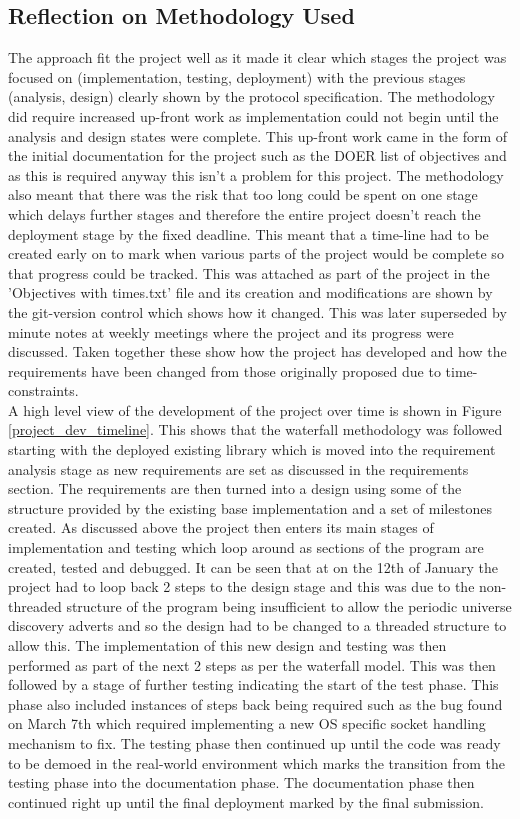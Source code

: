 \documentclass[11pt,a4paper]{report}
\begin{document}
\subsection{Reflection on Methodology Used}
The approach fit the project well as it made it clear which stages the project was focused on (implementation, testing, deployment) with the previous stages (analysis, design) clearly shown by the protocol specification. The methodology did require increased up-front work as implementation could not begin until the analysis and design states were complete. This up-front work came in the form of the initial documentation for the project such as the DOER list of objectives and as this is required anyway this isn't a problem for this project. The methodology also meant that there was the risk that too long could be spent on one stage which delays further stages and therefore the entire project doesn't reach the deployment stage by the fixed deadline. This meant that a time-line had to be created early on to mark when various parts of the project would be complete so that progress could be tracked. This was attached as part of the project in the 'Objectives with times.txt' file and its creation and modifications are shown by the git-version control which shows how it changed. This was later superseded by minute notes at weekly meetings where the project and its progress were discussed. Taken together these show how the project has developed and how the requirements have been changed from those originally proposed due to time-constraints. \\

A high level view of the development of the project over time is shown in Figure \ref{project_dev_timeline}. This shows that the waterfall methodology was followed starting with the deployed existing library which is moved into the requirement analysis stage as new requirements are set as discussed in the requirements section. The requirements are then turned into a design using some of the structure provided by the existing base implementation and a set of milestones created. As discussed above the project then enters its main stages of implementation and testing which loop around as sections of the program are created, tested and debugged. It can be seen that at on the 12th of January the project had to loop back 2 steps to the design stage and this was due to the non-threaded structure of the program being insufficient to allow the periodic universe discovery adverts and so the design had to be changed to a threaded structure to allow this. The implementation of this new design and testing was then performed as part of the next 2 steps as per the waterfall model. This was then followed by a stage of further testing indicating the start of the test phase. This phase also included instances of steps back being required such as the bug found on March 7th which required implementing a new OS specific socket handling mechanism to fix. The testing phase then continued up until the code was ready to be demoed in the real-world environment which marks the transition from the testing phase into the documentation phase. The documentation phase then continued right up until the final deployment marked by the final submission.\\
\end{document}
